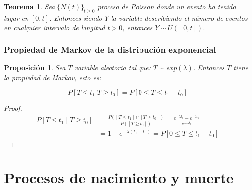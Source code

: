 \documentclass[a4paper,10pt]{scrartcl}
\newtheorem{theorem}{Teorema}
\newtheorem{fact}{Proposición}
\numberwithin{equation}{section}
\begin{document}

\begin{theorem}
 Sea $\{N(t)\}_{t\ge 0}$ proceso de Poisson donde un evento ha tenido lugar en $[0,t]$. Entonces siendo $Y$ la variable
 describiendo el número de eventos en cualquier intervalo de longitud $t > 0$, entonces $Y \sim U([0,t])$.
\end{theorem}


\subsubsection{Propiedad de Markov de la distribución exponencial}


\begin{fact}
 Sea $T$ variable aleatoria tal que: $T \sim exp(\lambda)$. Entonces $T$ tiene la propiedad de Markov, esto es:
 
 \[P[T \le t_1 | T \ge t_0] = P[0\le T \le t_1 - t_0] \]
\end{fact}

\begin{proof}
 \begin{align*}
 P[T \le t_1 \mid T\ge t_0] & =  \frac{P([T\le t_1] \cap [T\ge t_0])}{P([T\ge t_0])} = \frac{e^{-\lambda t_0} - e^{-\lambda t_1}}{e^{-\lambda t_0}} = \\
                            & =  1 - e^{-\lambda(t_1 - t_0)} = P[0\le T \le t_1-t_0]
 \end{align*}
\end{proof}

\section{Procesos de nacimiento y muerte}



\end{document}
